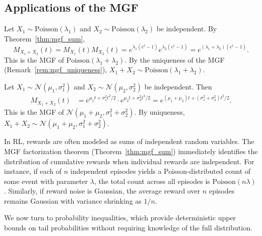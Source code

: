 \documentclass[11pt,a4paper]{article}
\begin{document}
\subsection{Applications of the MGF}

\begin{example}
\label{ex:sum_poisson}
Let $X_1 \sim \mathrm{Poisson}(\lambda_1)$ and
$X_2 \sim \mathrm{Poisson}(\lambda_2)$ be independent. By
Theorem~\ref{thm:mgf_sum},
\[
    M_{X_1 + X_2}(t) = M_{X_1}(t) M_{X_2}(t)
    = e^{\lambda_1(e^t - 1)} e^{\lambda_2(e^t - 1)}
    = e^{(\lambda_1 + \lambda_2)(e^t - 1)}.
\]
This is the MGF of $\mathrm{Poisson}(\lambda_1 + \lambda_2)$.
By the uniqueness of the MGF (Remark~\ref{rem:mgf_uniqueness}),
$X_1 + X_2 \sim \mathrm{Poisson}(\lambda_1 + \lambda_2)$.
\end{example}

\begin{example}
\label{ex:sum_normal}
Let $X_1 \sim \mathcal{N}(\mu_1, \sigma_1^2)$ and
$X_2 \sim \mathcal{N}(\mu_2, \sigma_2^2)$ be independent. Then
\begin{align*}
    M_{X_1 + X_2}(t) &= e^{\mu_1 t + \sigma_1^2 t^2/2}
    \cdot e^{\mu_2 t + \sigma_2^2 t^2/2}
    = e^{(\mu_1 + \mu_2)t + (\sigma_1^2 + \sigma_2^2)t^2/2}.
\end{align*}
This is the MGF of
$\mathcal{N}(\mu_1 + \mu_2, \sigma_1^2 + \sigma_2^2)$. By
uniqueness, $X_1 + X_2 \sim
\mathcal{N}(\mu_1 + \mu_2, \sigma_1^2 + \sigma_2^2)$.
\end{example}

\begin{rlconnection}[title={MGFs and Reward Distributions}]
In RL, rewards are often modeled as sums of independent random
variables. The MGF factorization theorem
(Theorem~\ref{thm:mgf_sum}) immediately identifies the distribution
of cumulative rewards when individual rewards are independent. For
instance, if each of $n$ independent episodes yields a Poisson-distributed
count of some event with parameter $\lambda$, the total count across
all episodes is $\mathrm{Poisson}(n\lambda)$. Similarly, if reward
noise is Gaussian, the average reward over $n$ episodes remains
Gaussian with variance shrinking as $1/n$.
\end{rlconnection}

We now turn to probability inequalities, which provide deterministic
upper bounds on tail probabilities without requiring knowledge of the
full distribution.

\end{document}

